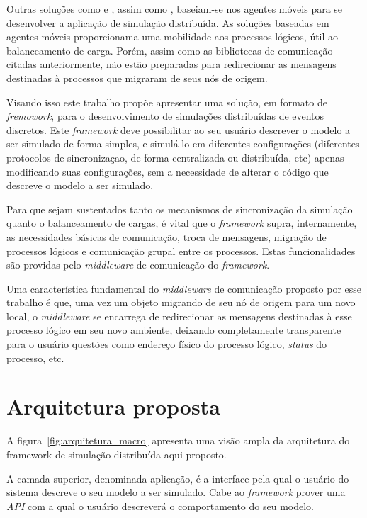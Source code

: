 Outras soluções como \cite{SASSY} e \cite{}, assim como \cite{RIBEIROALVES}, baseiam-se nos agentes móveis para se desenvolver a aplicação de simulação distribuída. As soluções baseadas em agentes móveis proporcionama uma mobilidade aos processos lógicos, útil ao balanceamento de carga. Porém, assim como as bibliotecas de comunicação citadas anteriormente, não estão preparadas para redirecionar as mensagens destinadas à processos que migraram de seus nós de origem.

Visando isso este trabalho propõe apresentar uma solução, em formato de \textit{fremowork}, para o desenvolvimento de simulações distribuídas de eventos discretos. Este \textit{framework} deve possibilitar ao seu usuário descrever o modelo a ser simulado de forma simples, e simulá-lo em diferentes configurações (diferentes protocolos de sincronizaçao, de forma centralizada ou distribuída, etc) apenas modificando suas configurações, sem a necessidade de alterar o código que descreve o modelo a ser simulado.

Para que sejam sustentados tanto os mecanismos de sincronização da simulação quanto o balanceamento de cargas, é vital que o \textit{framework} supra, internamente, as necessidades básicas de comunicação, troca de mensagens, migração de processos lógicos e comunicação grupal entre os processos. Estas funcionalidades são providas pelo \textit{middleware} de comunicação do \textit{framework}. 

Uma característica fundamental do \textit{middleware} de comunicação proposto por esse trabalho é que, uma vez um objeto migrando de seu nó de origem para um novo local, o \textit{middleware} se encarrega de redirecionar as mensagens destinadas à esse processo lógico em seu novo ambiente, deixando completamente transparente para o usuário questões como endereço físico do processo lógico, \textit{status} do processo, etc.

\section{Arquitetura proposta}

A figura~\ref{fig:arquitetura_macro} apresenta uma visão ampla da arquitetura do framework de simulação distribuída aqui proposto.

A camada superior, denominada aplicação, é a interface pela qual o usuário do sistema descreve o seu modelo a ser simulado. Cabe ao \textit{framework} prover uma \textit{API} com a qual o usuário descreverá o comportamento do seu modelo.

